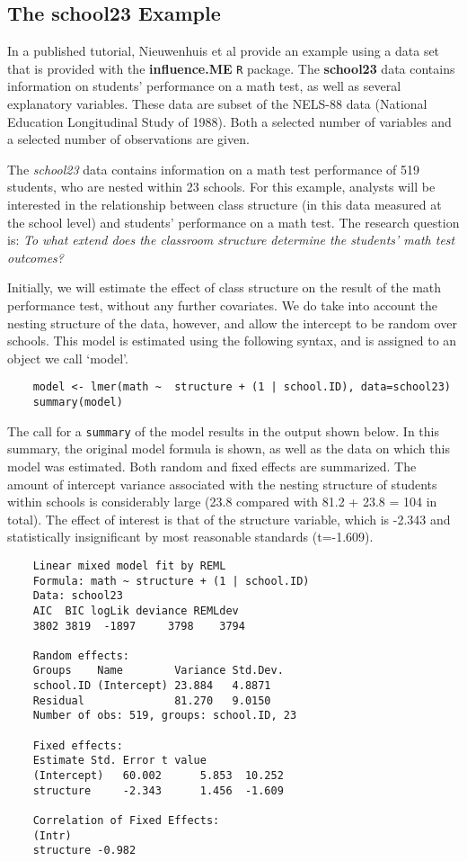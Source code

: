 \documentclass[12pt, a4paper]{article}
\begin{document}
\subsection{ The school23 Example }
In a published tutorial, Nieuwenhuis et al provide an example using a data set that is provided with the \textbf{influence.ME} \texttt{R} package. The \textbf{school23} data contains information on students’ performance on a math test, as well as several
explanatory variables. These data are subset of the NELS-88 data (National Education Longitudinal
Study of 1988). Both a selected number of variables and a selected number of observations are given.


The \textit{school23} data contains information on a math test performance of 519 students, who are nested within 23 schools. For this example,  analysts will be interested in the relationship between class structure (in this data measured at the school level) and students’ performance on a math test. The research question is: \textit{To what extend does the classroom structure determine the students’ math test outcomes?}

Initially, we will estimate the effect of class structure on the result of the math performance test, without any further covariates. We do take into account the nesting structure of the data, however, and allow the intercept to be random over schools. This model is estimated using the following syntax, and is assigned to an object we call ‘model’.
\begin{framed}
	\begin{verbatim}
	model <- lmer(math ~  structure + (1 | school.ID), data=school23)
	summary(model)
	\end{verbatim}
\end{framed}
The call for a \texttt{summary} of the model results in the output shown below. In this summary, the original model formula is shown, as well as the data on which this model was estimated. Both random and fixed effects are summarized. The amount of intercept variance associated with the nesting structure of students within schools is considerably large (23.8 compared with 81.2 + 23.8 = 104 in total). The effect of interest is that of the structure variable, which is -2.343 and statistically insignificant by most reasonable standards (t=-1.609).

\begin{framed}
	\begin{verbatim}
	Linear mixed model fit by REML 
	Formula: math ~ structure + (1 | school.ID) 
	Data: school23 
	AIC  BIC logLik deviance REMLdev
	3802 3819  -1897     3798    3794
	
	Random effects:
	Groups    Name        Variance Std.Dev.
	school.ID (Intercept) 23.884   4.8871  
	Residual              81.270   9.0150  
	Number of obs: 519, groups: school.ID, 23
	
	Fixed effects:
	Estimate Std. Error t value
	(Intercept)   60.002      5.853  10.252
	structure     -2.343      1.456  -1.609
	
	Correlation of Fixed Effects:
	(Intr)
	structure -0.982
	\end{verbatim}
\end{framed}
\end{document}
